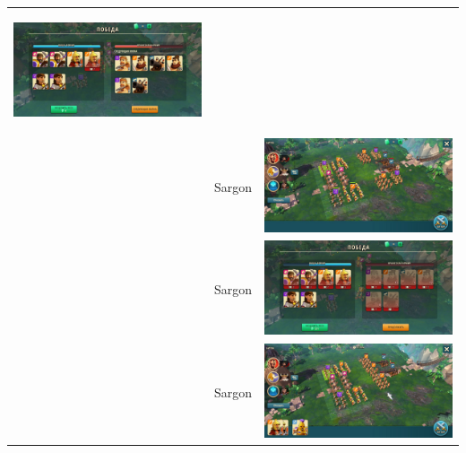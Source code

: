 \begin{longtable}{|c|c|c|}
    \hypertarget{fight34}{\includegraphics[width=0.75\linewidth]{./parts/media/TreasureHunt/34/sargon/photo_2022-04-07_10-08-16.jpg}} \\
    & Sargon &
    \includegraphics[width=0.75\linewidth]{./parts/media/TreasureHunt/34/sargon/photo_2022-04-07_10-08-19.jpg} \\
    & Sargon &
    \includegraphics[width=0.75\linewidth]{./parts/media/TreasureHunt/34/sargon/photo_2022-04-07_10-08-23.jpg} \\
    & Sargon &
    \includegraphics[width=0.75\linewidth]{./parts/media/TreasureHunt/34/sargon/photo_2022-04-07_10-08-04.jpg} \\

\end{longtable}
